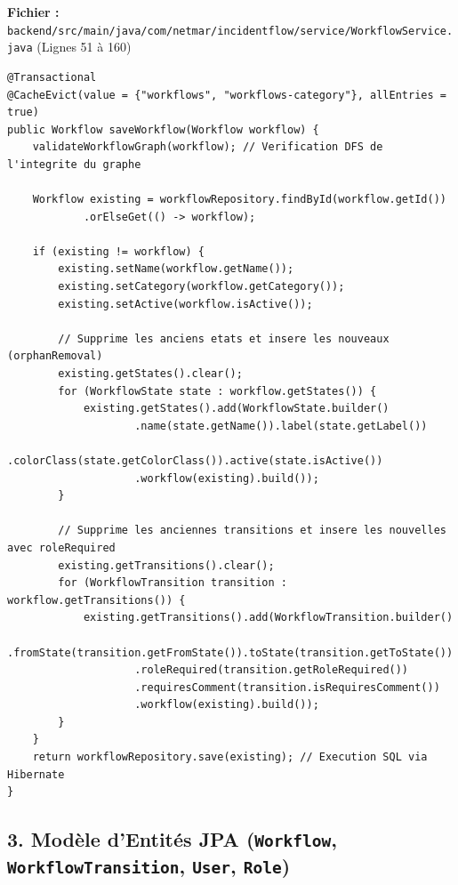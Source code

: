 \documentclass[11pt,a4paper]{article}
\begin{document}
\begin{codebox}[title=Localisation dans le Code :]
\textbf{Fichier :} \small\texttt{backend/src/main/java/com/netmar/incidentflow/service/WorkflowService.java} (Lignes 51 à 160)
\end{codebox}

\begin{lstlisting}[language=CustomJava, caption={Algorithme de persistance transactionnel dans WorkflowService.java}]
@Transactional
@CacheEvict(value = {"workflows", "workflows-category"}, allEntries = true)
public Workflow saveWorkflow(Workflow workflow) {
    validateWorkflowGraph(workflow); // Verification DFS de l'integrite du graphe

    Workflow existing = workflowRepository.findById(workflow.getId())
            .orElseGet(() -> workflow);

    if (existing != workflow) {
        existing.setName(workflow.getName());
        existing.setCategory(workflow.getCategory());
        existing.setActive(workflow.isActive());

        // Supprime les anciens etats et insere les nouveaux (orphanRemoval)
        existing.getStates().clear();
        for (WorkflowState state : workflow.getStates()) {
            existing.getStates().add(WorkflowState.builder()
                    .name(state.getName()).label(state.getLabel())
                    .colorClass(state.getColorClass()).active(state.isActive())
                    .workflow(existing).build());
        }

        // Supprime les anciennes transitions et insere les nouvelles avec roleRequired
        existing.getTransitions().clear();
        for (WorkflowTransition transition : workflow.getTransitions()) {
            existing.getTransitions().add(WorkflowTransition.builder()
                    .fromState(transition.getFromState()).toState(transition.getToState())
                    .roleRequired(transition.getRoleRequired())
                    .requiresComment(transition.isRequiresComment())
                    .workflow(existing).build());
        }
    }
    return workflowRepository.save(existing); // Execution SQL via Hibernate
}
\end{lstlisting}

\subsection{3. Modèle d'Entités JPA (\texttt{Workflow}, \texttt{WorkflowTransition}, \texttt{User}, \texttt{Role})}
\end{document}
